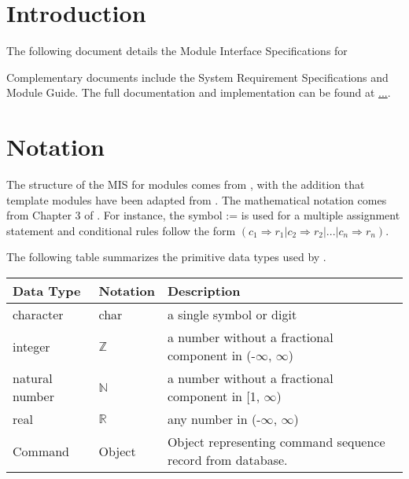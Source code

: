 \documentclass[12pt, titlepage]{article}
\begin{document}
\newpage

\tableofcontents

\newpage


\section{Introduction}

The following document details the Module Interface Specifications for

Complementary documents include the System Requirement Specifications
and Module Guide.  The full documentation and implementation can be
found at \url{...}.  

\section{Notation}


The structure of the MIS for modules comes from \citet{HoffmanAndStrooper1995},
with the addition that template modules have been adapted from
\cite{GhezziEtAl2003}.  The mathematical notation comes from Chapter 3 of
\citet{HoffmanAndStrooper1995}.  For instance, the symbol := is used for a
multiple assignment statement and conditional rules follow the form $(c_1
\Rightarrow r_1 | c_2 \Rightarrow r_2 | ... | c_n \Rightarrow r_n )$.

The following table summarizes the primitive data types used by \progname. 

\begin{center}
\renewcommand{\arraystretch}{1.2}
\noindent 
\begin{tabular}{l l p{7.5cm}} 
\toprule 
\textbf{Data Type} & \textbf{Notation} & \textbf{Description}\\ 
\midrule
character & char & a single symbol or digit\\
integer & $\mathbb{Z}$ & a number without a fractional component in (-$\infty$, $\infty$) \\
natural number & $\mathbb{N}$ & a number without a fractional component in [1, $\infty$) \\
real & $\mathbb{R}$ & any number in (-$\infty$, $\infty$)\\
Command & Object & Object representing command sequence record from database.\\
\bottomrule
\end{tabular} 
\end{center}
\end{document}
